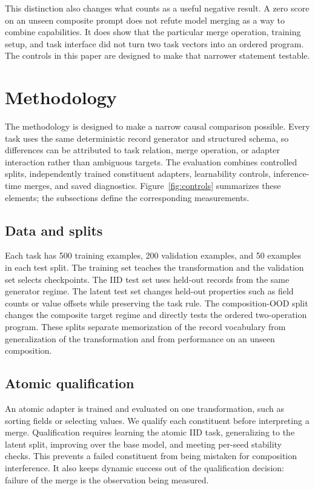 \documentclass[10pt,twocolumn]{article}
\begin{document}
This distinction also changes what counts as a useful negative result. A zero score on an unseen composite prompt does not refute model merging as a way to combine capabilities. It does show that the particular merge operation, training setup, and task interface did not turn two task vectors into an ordered program. The controls in this paper are designed to make that narrower statement testable.

\section{Methodology}

The methodology is designed to make a narrow causal comparison possible. Every task uses the same deterministic record generator and structured schema, so differences can be attributed to task relation, merge operation, or adapter interaction rather than ambiguous targets. The evaluation combines controlled splits, independently trained constituent adapters, learnability controls, inference-time merges, and saved diagnostics. Figure~\ref{fig:controls} summarizes these elements; the subsections define the corresponding measurements.

\subsection{Data and splits}

Each task has 500 training examples, 200 validation examples, and 50 examples in each test split. The training set teaches the transformation and the validation set selects checkpoints. The IID test set uses held-out records from the same generator regime. The latent test set changes held-out properties such as field counts or value offsets while preserving the task rule. The composition-OOD split changes the composite target regime and directly tests the ordered two-operation program. These splits separate memorization of the record vocabulary from generalization of the transformation and from performance on an unseen composition.

\subsection{Atomic qualification}

An atomic adapter is trained and evaluated on one transformation, such as sorting fields or selecting values. We qualify each constituent before interpreting a merge. Qualification requires learning the atomic IID task, generalizing to the latent split, improving over the base model, and meeting per-seed stability checks. This prevents a failed constituent from being mistaken for composition interference. It also keeps dynamic success out of the qualification decision: failure of the merge is the observation being measured.
\end{document}
